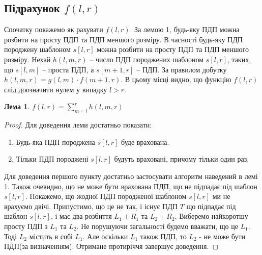 \documentclass[
  11pt,
  a4paper
]{extarticle}
\newtheorem{lemma}{Лема}
\theoremstyle{definition}
\theoremstyle{remark}
\begin{document}
  \subsection{Підрахунок $f(l, r)$}
    Спочатку покажемо як рахувати $f(l, r)$. За лемою 1, будь-яку ПДП можна розбити на просту ПДП та ПДП меншого розміру. 
    В часності будь-яку ПДП породжену шаблоном $s[l, r]$ можна розбити на просту ПДП та ПДП меншого розміру. Нехай $h(l, m, r)$ -- число ПДП породжених шаблоном $s[l, r]$, таких, що $s[l, m]$ -- проста ПДП, а $s[m + 1, r]$ -- ПДП. 
    За правилом добутку $h(l, m, r) = g(l, m) \cdot f(m + 1, r)$. В цьому місці видно, що функцію $f(l, r)$ слід доозначити нулем у випадку $l > r$.
    \newpage
    \begin{lemma}
      $f(l, r) = \sum_{m = l}^{r}{h(l, m, r)}$
    \end{lemma}
    \begin{proof}
      Для доведення леми достатньо показати:
      \begin{enumerate}
        \item{Будь-яка ПДП породжена $s[l, r]$ буде врахована.}
        \item{Тільки ПДП породжені $s[l, r]$ будуть враховані, причому тільки один раз.}
      \end{enumerate}
      Для доведення першого пункту достатньо застосувати алгоритм наведений в лемі 1.
      Також очевидно, що не може бути врахована ПДП, що не підпадає під шаблон $s[l, r]$.
      Покажемо, що жодної ПДП породженої шаблоном $s[l, r]$ ми не врахуємо двічі. Припустимо, що це не так, і існує ПДП $T$ що підпадає під шаблон $s[l, r]$, і має два розбиття $L_{1} + R_{1}$ та $L_{2} + R_{2}$. Виберемо найкоротшу просту ПДП з $L_{1}$ та $L_{2}$. Не порушуючи загальності будемо вважати, що це $L_{1}$. Тоді $L_{2}$ містить в собі $L_{1}$. Але оскільки $L_{1}$ також ПДП, то $L_{2}$ - не може бути ПДП(за визначенням). Отримане протиріччя завершує доведення.
    \end{proof}
\end{document}
